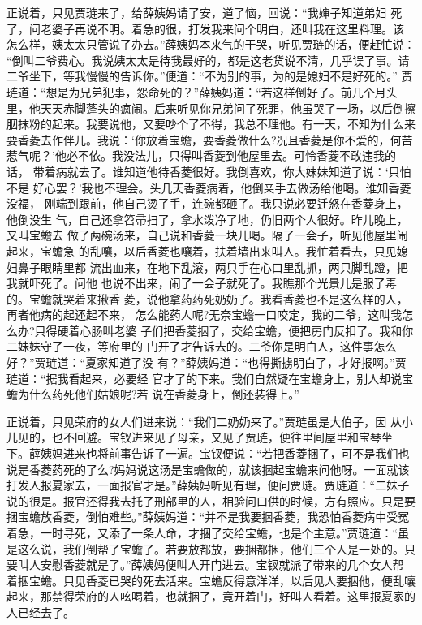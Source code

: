 正说着，只见贾琏来了，给薛姨妈请了安，道了恼，回说：“我婶子知道弟妇
死了，问老婆子再说不明。着急的很，打发我来问个明白，还叫我在这里料理。该
怎么样，姨太太只管说了办去。”薛姨妈本来气的干哭，听见贾琏的话，便赶忙说：
“倒叫二爷费心。我说姨太太是待我最好的，都是这老货说不清，几乎误了事。请
二爷坐下，等我慢慢的告诉你。”便道：“不为别的事，为的是媳妇不是好死的。”
贾琏道：“想是为兄弟犯事，怨命死的？”薛姨妈道：“若这样倒好了。前几个月头
里，他天天赤脚蓬头的疯闹。后来听见你兄弟问了死罪，他虽哭了一场，以后倒擦
胭抹粉的起来。我要说他，又要吵个了不得，我总不理他。有一天，不知为什么来
要香菱去作伴儿。我说：‘你放着宝蟾，要香菱做什么?况且香菱是你不爱的，何苦
惹气呢？’他必不依。我没法儿，只得叫香菱到他屋里去。可怜香菱不敢违我的话，
带着病就去了。谁知道他待香菱很好。我倒喜欢，你大妹妹知道了说：‘只怕不是
好心罢？’我也不理会。头几天香菱病着，他倒亲手去做汤给他喝。谁知香菱没福，
刚端到跟前，他自己烫了手，连碗都砸了。我只说必要迁怒在香菱身上，他倒没生
气，自己还拿笤帚扫了，拿水泼净了地，仍旧两个人很好。昨儿晚上，又叫宝蟾去
做了两碗汤来，自己说和香菱一块儿喝。隔了一会子，听见他屋里闹起来，宝蟾急
的乱嚷，以后香菱也嚷着，扶着墙出来叫人。我忙着看去，只见媳妇鼻子眼睛里都
流出血来，在地下乱滚，两只手在心口里乱抓，两只脚乱蹬，把我就吓死了。问他
也说不出来，闹了一会子就死了。我瞧那个光景儿是服了毒的。宝蟾就哭着来揪香
菱，说他拿药药死奶奶了。我看香菱也不是这么样的人，再者他病的起还起不来，
怎么能药人呢?无奈宝蟾一口咬定，我的二爷，这叫我怎么办?只得硬着心肠叫老婆
子们把香菱捆了，交给宝蟾，便把房门反扣了。我和你二妹妹守了一夜，等府里的
门开了才告诉去的。二爷你是明白人，这件事怎么好？”贾琏道：“夏家知道了没
有？”薛姨妈道：“也得撕掳明白了，才好报啊。”贾琏道：“据我看起来，必要经
官才了的下来。我们自然疑在宝蟾身上，别人却说宝蟾为什么药死他们姑娘呢?若
说在香菱身上，倒还装得上。”

正说着，只见荣府的女人们进来说：“我们二奶奶来了。”贾琏虽是大伯子，因
从小儿见的，也不回避。宝钗进来见了母亲，又见了贾琏，便往里间屋里和宝琴坐
下。薛姨妈进来也将前事告诉了一遍。宝钗便说：“若把香菱捆了，可不是我们也
说是香菱药死的了么?妈妈说这汤是宝蟾做的，就该捆起宝蟾来问他呀。一面就该
打发人报夏家去，一面报官才是。”薛姨妈听见有理，便问贾琏。贾琏道：“二妹子
说的很是。报官还得我去托了刑部里的人，相验问口供的时候，方有照应。只是要
捆宝蟾放香菱，倒怕难些。”薛姨妈道：“并不是我要捆香菱，我恐怕香菱病中受冤
着急，一时寻死，又添了一条人命，才捆了交给宝蟾，也是个主意。”贾琏道：“虽
是这么说，我们倒帮了宝蟾了。若要放都放，要捆都捆，他们三个人是一处的。只
要叫人安慰香菱就是了。”薛姨妈便叫人开门进去。宝钗就派了带来的几个女人帮
着捆宝蟾。只见香菱已哭的死去活来。宝蟾反得意洋洋，以后见人要捆他，便乱嚷
起来，那禁得荣府的人吆喝着，也就捆了，竟开着门，好叫人看着。这里报夏家的
人已经去了。


